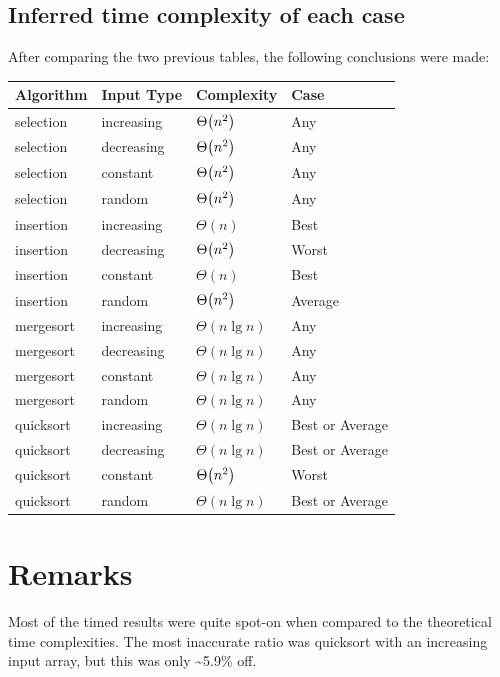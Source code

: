 \documentclass[11pt]{article}
\let\originalleft\left
\let\originalright\right
\renewcommand{\left}{\mathopen{}\mathclose\bgroup\originalleft}
\renewcommand{\right}{\aftergroup\egroup\originalright}
\begin{document}
\subsection{Inferred time complexity of each case}
\label{sec:org194729f}

After comparing the two previous tables, the following conclusions were made:

\begin{center}
\begin{tabular}{llll}
Algorithm & Input Type & Complexity & Case\\
\hline
selection & increasing & \(\Theta\left(n^2\right)\) & Any\\
selection & decreasing & \(\Theta\left(n^2\right)\) & Any\\
selection & constant & \(\Theta\left(n^2\right)\) & Any\\
selection & random & \(\Theta\left(n^2\right)\) & Any\\
\hline
insertion & increasing & \(\Theta(n)\) & Best\\
insertion & decreasing & \(\Theta\left(n^2\right)\) & Worst\\
insertion & constant & \(\Theta(n)\) & Best\\
insertion & random & \(\Theta\left(n^2\right)\) & Average\\
\hline
mergesort & increasing & \(\Theta(n \lg n)\) & Any\\
mergesort & decreasing & \(\Theta(n \lg n)\) & Any\\
mergesort & constant & \(\Theta(n \lg n)\) & Any\\
mergesort & random & \(\Theta(n \lg n)\) & Any\\
\hline
quicksort & increasing & \(\Theta(n \lg n)\) & Best or Average\\
quicksort & decreasing & \(\Theta(n \lg n)\) & Best or Average\\
quicksort & constant & \(\Theta\left(n^2\right)\) & Worst\\
quicksort & random & \(\Theta(n \lg n)\) & Best or Average\\
\end{tabular}
\end{center}

\section{Remarks}
\label{sec:org35a8301}

Most of the timed results were quite spot-on when compared to the theoretical
time complexities. The most inaccurate ratio was quicksort with an increasing
input array, but this was only \textasciitilde{}5.9\% off.
\end{document}
